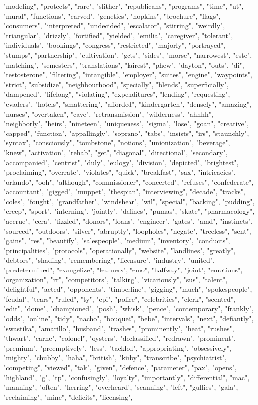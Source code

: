 "modeling", "protects", "rare", "slither", "republicans", "programs", "time", "ut", "mural", "functions", "carved", "genetics", "hopkins", "brochure", "flags", "consumers", "interpreted", "undecided", "escalator", "stirring", "weirdly", "triangular", "drizzly", "fortified", "yielded", "emilia", "caregiver", "tolerant", "individuals", "bookings", "congress", "restricted", "majorly", "portrayed", "stumps", "partnership", "cultivation", "gets", "sides", "morse", "narrowest", "este", "matching", "semesters", "translations", "fairest", "phew", "dayton", "outs", "di", "testosterone", "filtering", "intangible", "employer", "suites", "engine", "waypoints", "strict", "subsidize", "neighbourhood", "specially", "blends", "superficially", "dampened", "lifelong", "violating", "expenditures", "lending", "requesting", "evaders", "hotels", "smattering", "afforded", "kindergarten", "densely", "amazing", "nurses", "overtaken", "cave", "retransmission", "wilderness", "ahhhh", "neighborly", "heirs", "nineteen", "uniqueness", "sigma", "lose", "goan", "creative", "capped", "function", "appallingly", "soprano", "tabs", "insists", "irs", "staunchly", "syntax", "consciously", "tombstone", "notions", "unionization", "beverage", "knew", "activation", "rehab", "get", "diagonal", "directional", "secondary", "accompanied", "centrist", "duly", "eulogy", "division", "depicted", "brightest", "proclaiming", "overrate", "violates", "quick", "breakfast", "sax", "intricacies", "orlando", "ooh", "although", "commissioner", "concerted", "refuses", "confederate", "accountant", "gigged", "muppet", "thespian", "interviewing", "decade", "tracks", "coles", "fought", "grandfather", "windshear", "wil", "special", "backing", "pudding", "creep", "sport", "interning", "jointly", "defines", "pumas", "skate", "pharmacology", "accrue", "cera", "fizzled", "donors", "loans", "engineer", "gates", "amd", "instincts", "sourced", "outdoors", "silver", "abruptly", "loopholes", "negate", "treeless", "sent", "gains", "res", "beautify", "salespeople", "medium", "inventory", "conducts", "principalities", "protocols", "operationally", "website", "landlines", "greatly", "debtors", "shading", "remembering", "licensure", "industry", "united", "predetermined", "evangelize", "learners", "emo", "halfway", "joint", "emotions", "organization", "rr", "competitors", "talking", "vicariously", "sus", "talent", "delightful", "acted", "opponents", "timberline", "gigging", "much", "spokespeople", "feudal", "tears", "ruled", "ty", "epi", "police", "celebrities", "clerk", "scented", "edit", "dome", "championed", "posh", "whisk", "pence", "contemporary", "frankly", "odds", "online", "tidy", "nacho", "bouquet", "bebe", "intervals", "next", "defiantly", "swastika", "amarillo", "husband", "trashes", "prominently", "heat", "rushes", "thwart", "carne", "colonel", "oysters", "declassified", "redrawn", "prominent", "premium", "preemptively", "less", "tackled", "appropriating", "obsessively", "mighty", "chubby", "haha", "british", "kirby", "transcribe", "psychiatrist", "competing", "viewed", "tak", "given", "defence", "parameter", "pax", "opens", "highland", "g", "tp", "confusingly", "loyalty", "importantly", "differential", "mac", "manning", "often", "herring", "overheard", "scanning", "left", "gullies", "gala", "reclaiming", "mine", "deficits", "licensing", 